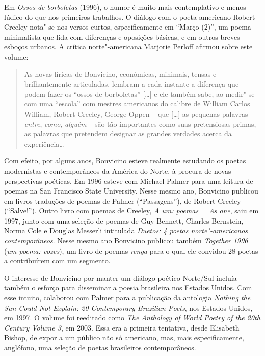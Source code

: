Em \emph{Ossos de borboletas} (1996), o humor é muito mais contemplativo
e menos lúdico do que nos primeiros trabalhos. O diálogo com o poeta
americano Robert Creeley nota"-se nos versos curtos, especificamente em
``Março (2)'', um poema minimalista que lida com diferenças e oposições
básicas, e em outros breves esboços urbanos. A crítica norte"-americana
Marjorie Perloff afirmou sobre este volume:

\begin{quote}
As novas líricas de Bonvicino, econômicas, minimais, tensas e
brilhantemente articuladas, lembram a cada instante a diferença que
podem fazer os ``ossos de borboletas'' {[}\ldots{}{]} e ele também sabe,
ao medir"-se com uma ``escola'' com mestres americanos do calibre de
William Carlos William, Robert Creeley, George Oppen -- que
{[}\ldots{}{]} as pequenas palavras -- \emph{entre}, \emph{como},
\emph{alguém} -- são tão importantes como suas pretensiosas primas, as
palavras que pretendem designar as grandes verdades acerca da
experiência\ldots{}
\end{quote}

Com efeito, por alguns anos, Bonvicino esteve realmente estudando os
poetas modernistas e contemporâneos da América do Norte, à procura de
novas perspectivas poéticas. Em 1996 esteve com Michael Palmer para uma
leitura de poemas na San Francisco State University. Nesse mesmo ano,
Bonvicino publicou em livros traduções de poemas de Palmer
(``Passagens''), de Robert Creeley (``Salve!''). Outro livro com poemas
de Creeley, \emph{A um: poemas = As one}, saiu em 1997, junto com uma
seleção de poemas de Guy Bennett, Charles Bernstein, Norma Cole e
Douglas Messerli intitulada \emph{Duetos: 4 poetas norte"-americanos
contemporâneos}. Nesse mesmo ano Bonvicino publicou também
\emph{Together 1996} (\emph{um poema: vozes}), um livro de poemas
\emph{renga} para o qual ele convidou 28 poetas a contribuírem com um
segmento.

O interesse de Bonvicino por manter um diálogo poético Norte/Sul incluía
também o esforço para disseminar a poesia brasileira nos Estados Unidos.
Com esse intuito, colaborou com Palmer para a publicação da antologia
\emph{Nothing the Sun Could Not Explain: 20 Contemporary Brazilian
Poets}, nos Estados Unidos, em 1997. O volume foi reeditado como
\emph{The  Anthology of World Poetry of the 20th Century Volume 3},
em 2003. Essa era a primeira tentativa, desde Elisabeth Bishop, de expor
a um público não só americano, mas, mais especificamente, anglófono, uma
seleção de poetas brasileiros contemporâneos.

